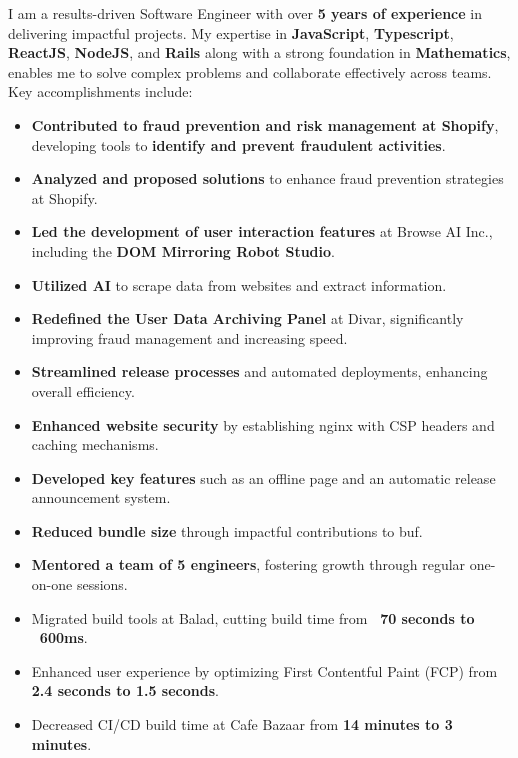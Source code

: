 I am a results-driven Software Engineer with over \textbf{5 years of experience} in delivering impactful projects. My expertise in \textbf{JavaScript}, \textbf{Typescript}, \textbf{ReactJS}, \textbf{NodeJS}, and \textbf{Rails} along with a strong foundation in \textbf{Mathematics}, enables me to solve complex problems and collaborate effectively across teams. Key accomplishments include:
\medskip
\begin{itemize}
    \item \textbf{Contributed to fraud prevention and risk management at Shopify}, developing tools to \textbf{identify and prevent fraudulent activities}.
    \item \textbf{Analyzed and proposed solutions} to enhance fraud prevention strategies at Shopify.
    \item \textbf{Led the development of user interaction features} at Browse AI Inc., including the \textbf{DOM Mirroring Robot Studio}.
    \item \textbf{Utilized AI} to scrape data from websites and extract information.
    \item \textbf{Redefined the User Data Archiving Panel} at Divar, significantly improving fraud management and increasing speed.
    \item \textbf{Streamlined release processes} and automated deployments, enhancing overall efficiency.
    \item \textbf{Enhanced website security} by establishing nginx with CSP headers and caching mechanisms.
    \item \textbf{Developed key features} such as an offline page and an automatic release announcement system.
    \item \textbf{Reduced bundle size} through impactful contributions to buf.
    \item \textbf{Mentored a team of 5 engineers}, fostering growth through regular one-on-one sessions.
    \item Migrated build tools at Balad, cutting build time from \textbf{~70 seconds to ~600ms}.
    \item Enhanced user experience by optimizing First Contentful Paint (FCP) from \textbf{2.4 seconds to 1.5 seconds}.
    \item Decreased CI/CD build time at Cafe Bazaar from \textbf{14 minutes to 3 minutes}.
\end{itemize}

\null
\vfill
\null

